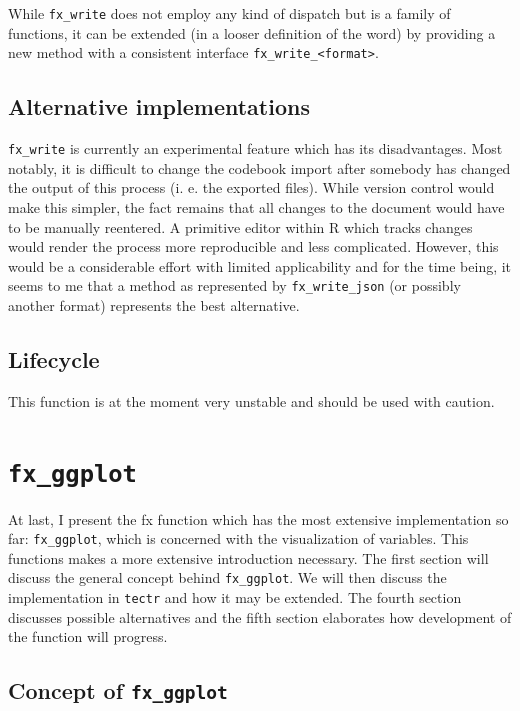 \documentclass[]{report}
\theoremstyle{definition}
\theoremstyle{definition}
\theoremstyle{definition}
\theoremstyle{remark}
\begin{document}
While \texttt{fx\_write} does not employ any kind of dispatch but is a
family of functions, it can be extended (in a looser definition of the
word) by providing a new method with a consistent interface
\texttt{fx\_write\_\textless{}format\textgreater{}}.

\subsection{Alternative
implementations}\label{alternative-implementations-1}

\texttt{fx\_write} is currently an experimental feature which has its
disadvantages. Most notably, it is difficult to change the codebook
import after somebody has changed the output of this process (i. e. the
exported files). While version control would make this simpler, the fact
remains that all changes to the document would have to be manually
reentered. A primitive editor within R which tracks changes would render
the process more reproducible and less complicated. However, this would
be a considerable effort with limited applicability and for the time
being, it seems to me that a method as represented by
\texttt{fx\_write\_json} (or possibly another format) represents the
best alternative.

\subsection{Lifecycle}\label{lifecycle-3}

This function is at the moment very unstable and should be used with
caution.

\hypertarget{fx-ggplot}{\section{\texorpdfstring{\texttt{fx\_ggplot}}{fx\_ggplot}}\label{fx-ggplot}}

At last, I present the fx function which has the most extensive
implementation so far: \texttt{fx\_ggplot}, which is concerned with the
visualization of variables. This functions makes a more extensive
introduction necessary. The first section will discuss the general
concept behind \texttt{fx\_ggplot}. We will then discuss the
implementation in \texttt{tectr} and how it may be extended. The fourth
section discusses possible alternatives and the fifth section elaborates
how development of the function will progress.

\subsection{\texorpdfstring{Concept of
\texttt{fx\_ggplot}}{Concept of fx\_ggplot}}\label{concept-of-fx_ggplot}
\end{document}
